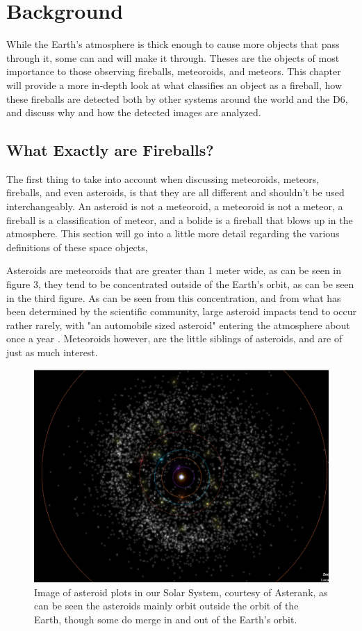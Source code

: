 \chapter{Background}

While the Earth's atmosphere is thick enough to cause more objects that pass through it, some can and will make it through. Theses are the objects of most importance to those observing fireballs, meteoroids, and meteors. This chapter will provide a more in-depth look at what classifies an object as a fireball, how these fireballs are detected both by other systems around the world and the D6, and discuss why and how the detected images are analyzed.

\section{What Exactly are Fireballs?}

The first thing to take into account when discussing meteoroids, meteors, fireballs, and even asteroids, is that they are all different and shouldn't be used interchangeably. 
An asteroid is not a meteoroid, a meteoroid is not a meteor, a fireball is a classification of meteor, and a bolide is a fireball that blows up in the atmosphere. 
This section will go into a little more detail regarding the various definitions of these space objects, 

Asteroids are meteoroids that are greater than 1 meter wide, as can be seen in figure 3, they tend to be concentrated outside of the Earth's orbit, as can be seen in the third figure.
As can be seen from this concentration, and from what has been determined by the scientific community, large asteroid impacts tend to occur rather rarely, with "an automobile sized asteroid" entering the atmosphere about once a year \cite{atkinson_2018}. 
Meteoroids however, are the little siblings of asteroids, and are of just as much interest.

\begin{figure}
    \centering
    \includegraphics[width=12cm]{Solar-System-Asteroids.png}
    \centering
    \caption{Image of asteroid plots in our Solar System, courtesy of Asterank, as can be seen the asteroids mainly orbit outside the orbit of the Earth, though some do merge in and out of the Earth's orbit.}
    \label{Figure 3}
\end{figure}

